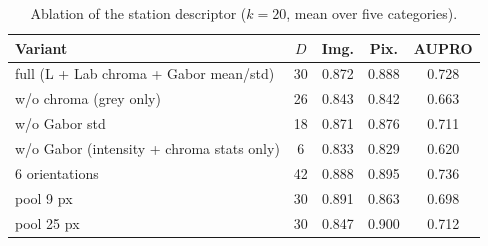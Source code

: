 \begin{table}[t]
\centering
\caption{Ablation of the station descriptor ($k=20$, mean over five categories).}
\label{tab:ablation}
\scriptsize
\setlength{\tabcolsep}{4pt}
\begin{tabular}{@{}lcccc@{}}
\toprule
Variant & $D$ & Img. & Pix. & AUPRO \\
\midrule
full (L + Lab chroma + Gabor mean/std) & 30 & 0.872 & 0.888 & 0.728 \\
w/o chroma (grey only) & 26 & 0.843 & 0.842 & 0.663 \\
w/o Gabor std & 18 & 0.871 & 0.876 & 0.711 \\
w/o Gabor (intensity + chroma stats only) & 6 & 0.833 & 0.829 & 0.620 \\
6 orientations & 42 & 0.888 & 0.895 & 0.736 \\
pool 9 px & 30 & 0.891 & 0.863 & 0.698 \\
pool 25 px & 30 & 0.847 & 0.900 & 0.712 \\
\bottomrule
\end{tabular}
\end{table}
